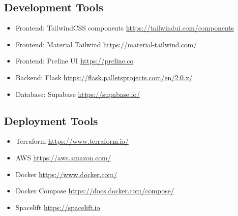 \documentclass[a4paper, 11pt]{article}
\begin{document}
\subsection*{Development Tools}


\begin{itemize}
    \item Frontend: TailwindCSS components \url{https://tailwindui.com/components}
    \item Frontend: Material Tailwind \url{https://material-tailwind.com/}
    \item Frontend: Preline UI \url{https://preline.co}
    \item Backend: Flask \url{https://flask.palletsprojects.com/en/2.0.x/}
    \item Database: Supabase \url{https://supabase.io/}
\end{itemize}

\subsection*{Deployment Tools}

\begin{itemize}
    \item Terraform \url{https://www.terraform.io/}
    \item AWS \url{https://aws.amazon.com/}
    \item Docker \url{https://www.docker.com/}
    \item Docker Compose \url{https://docs.docker.com/compose/}
    \item Spacelift \url{https://spacelift.io} 
\end{itemize}
\end{document}
